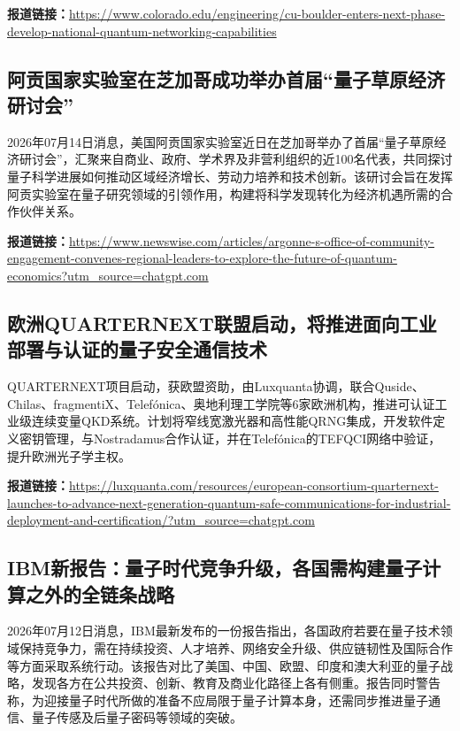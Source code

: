 \documentclass[12pt,a4paper]{ctexart}
\begin{document}
\noindent\textbf{报道链接：}\url{https://www.colorado.edu/engineering/cu-boulder-enters-next-phase-develop-national-quantum-networking-capabilities}

\subsection{ 阿贡国家实验室在芝加哥成功举办首届“量子草原经济研讨会” }

2026年07月14日消息，美国阿贡国家实验室近日在芝加哥举办了首届“量子草原经济研讨会”，汇聚来自商业、政府、学术界及非营利组织的近100名代表，共同探讨量子科学进展如何推动区域经济增长、劳动力培养和技术创新。该研讨会旨在发挥阿贡实验室在量子研究领域的引领作用，构建将科学发现转化为经济机遇所需的合作伙伴关系。

\noindent\textbf{报道链接：}\url{https://www.newswise.com/articles/argonne-s-office-of-community-engagement-convenes-regional-leaders-to-explore-the-future-of-quantum-economics?utm\_source=chatgpt.com}

\subsection{ 欧洲QUARTERNEXT联盟启动，将推进面向工业部署与认证的量子安全通信技术 }

QUARTERNEXT项目启动，获欧盟资助，由Luxquanta协调，联合Quside、Chilas、fragmentiX、Telefónica、奥地利理工学院等6家欧洲机构，推进可认证工业级连续变量QKD系统。计划将窄线宽激光器和高性能QRNG集成，开发软件定义密钥管理，与Nostradamus合作认证，并在Telefónica的TEFQCI网络中验证，提升欧洲光子学主权。

\noindent\textbf{报道链接：}\url{https://luxquanta.com/resources/european-consortium-quarternext-launches-to-advance-next-generation-quantum-safe-communications-for-industrial-deployment-and-certification/?utm\_source=chatgpt.com}

\subsection{ IBM新报告：量子时代竞争升级，各国需构建量子计算之外的全链条战略 }

2026年07月12日消息，IBM最新发布的一份报告指出，各国政府若要在量子技术领域保持竞争力，需在持续投资、人才培养、网络安全升级、供应链韧性及国际合作等方面采取系统行动。该报告对比了美国、中国、欧盟、印度和澳大利亚的量子战略，发现各方在公共投资、创新、教育及商业化路径上各有侧重。报告同时警告称，为迎接量子时代所做的准备不应局限于量子计算本身，还需同步推进量子通信、量子传感及后量子密码等领域的突破。
\end{document}
